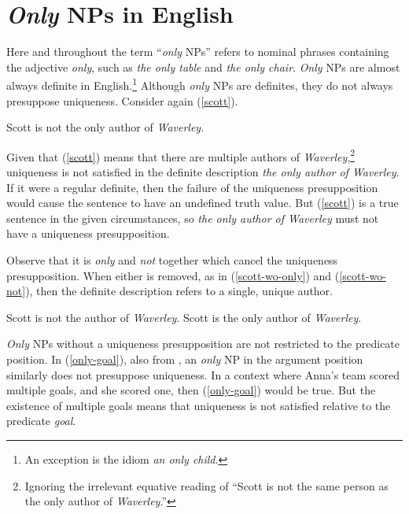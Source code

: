 \section{\textit{Only} NPs in English \label{sec:only-nps-english}}
Here and throughout the term ``\textit{only} NPs'' refers to nominal phrases containing the adjective \textit{only}, such as \textit{the only table} and \textit{the only chair}. \textit{Only} NPs are almost always definite in English.\footnote{An exception is the idiom \textit{an only child}.} Although \textit{only} NPs are definites, they do not always presuppose uniqueness. Consider again (\ref{scott}).

\begin{exe}
	 Scott is not the only author of \textit{Waverley}.
\end{exe}

Given that (\ref{scott}) means that there are multiple authors of \textit{Waverley},\footnote{Ignoring the irrelevant equative reading of ``Scott is not the same person as the only author of \textit{Waverley}.''} uniqueness is not satisfied in the definite description \textit{the only author of Waverley}. If it were a regular definite, then the failure of the uniqueness presupposition would cause the sentence to have an undefined truth value. But (\ref{scott}) is a true sentence in the given circumstances, so \textit{the only author of Waverley} must not have a uniqueness presupposition.

Observe that it is \textit{only} and \textit{not} together which cancel the uniqueness presupposition. When either is removed, as in (\ref{scott-wo-only}) and (\ref{scott-wo-not}), then the definite description refers to a single, unique author.

\begin{exe}
	\ex \label{scott-wo-only} Scott is not the author of \textit{Waverley}.
	\ex \label{scott-wo-not} Scott is the only author of \textit{Waverley}.
\end{exe}

\textit{Only} NPs without a uniqueness presupposition are not restricted to the predicate position. In (\ref{only-goal}), also from \citet{cb2015}, an \textit{only} NP in the argument position similarly does not presuppose uniqueness. In a context where Anna's team scored multiple goals, and she scored one, then (\ref{only-goal}) would be true. But the existence of multiple goals means that uniqueness is not satisfied relative to the predicate \textit{goal}.

